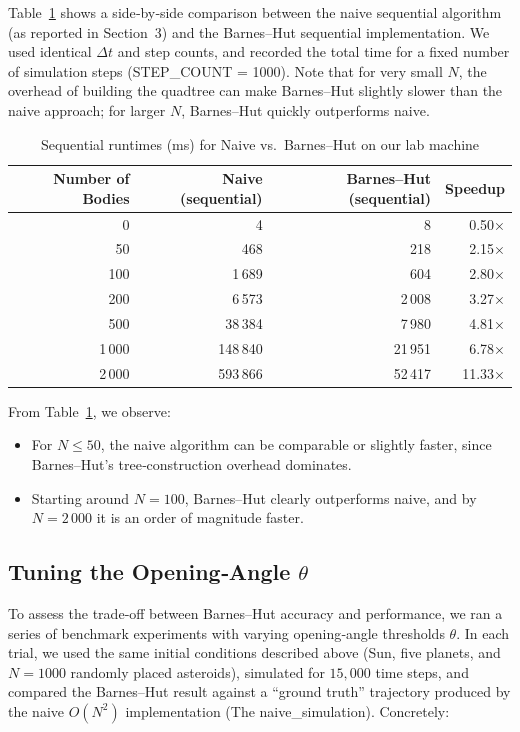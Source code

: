 \documentclass{article}
\begin{document}
Table~\ref{tab:naive_vs_bh} shows a side‐by‐side comparison between the naive sequential algorithm (as reported in Section~3) and the Barnes–Hut sequential implementation.  We used identical $\Delta t$ and step counts, and recorded the total time for a fixed number of simulation steps (STEP\_COUNT = 1000).  Note that for very small $N$, the overhead of building the quadtree can make Barnes–Hut slightly slower than the naive approach; for larger $N$, Barnes–Hut quickly outperforms naive.

\begin{table}[H]
    \centering
    \begin{tabular}{|r|r|r|r|}
    \hline
    \textbf{Number of Bodies} & \textbf{Naive (sequential)} & \textbf{Barnes–Hut (sequential)} & \textbf{Speedup}\\
    \hline
    0     & 4      & 8       & 0.50× \\ 
    50    & 468    & 218     & 2.15× \\ 
    100   & 1\,689 & 604     & 2.80× \\ 
    200   & 6\,573 & 2\,008  & 3.27× \\ 
    500   & 38\,384& 7\,980  & 4.81× \\ 
    1\,000 & 148\,840 & 21\,951 & 6.78× \\ 
    2\,000 & 593\,866 & 52\,417 & 11.33× \\ 
    \hline
    \end{tabular}
    \caption{Sequential runtimes (ms) for Naive vs.\ Barnes–Hut on our lab machine}
    \label{tab:naive_vs_bh}
\end{table}

\noindent
From Table~\ref{tab:naive_vs_bh}, we observe:
\begin{itemize}
  \item For $N \le 50$, the naive algorithm can be comparable or slightly faster, since Barnes–Hut’s tree‐construction overhead dominates.
  \item Starting around $N = 100$, Barnes–Hut clearly outperforms naive, and by $N=2\,000$ it is an order of magnitude faster.
\end{itemize}

\subsection{Tuning the Opening‐Angle \(\theta\)}
\label{theta_tuning}

To assess the trade‐off between Barnes–Hut accuracy and performance, we ran a series of benchmark experiments with varying opening‐angle thresholds \(\theta\).  In each trial, we used the same initial conditions described above (Sun, five planets, and \(N=1000\) randomly placed asteroids), simulated for \(15{,}000\) time steps, and compared the Barnes–Hut result against a “ground truth” trajectory produced by the naive \(O(N^2)\) implementation (The naive\_simulation).  Concretely:
\end{document}
